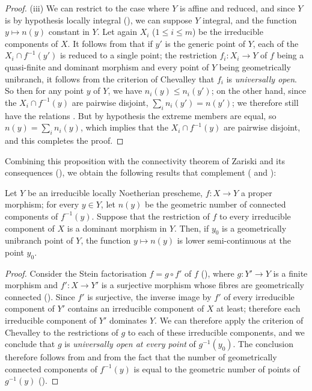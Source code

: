 \begin{proof}
(iii)
We can restrict to the case where $Y$ is affine and reduced, and since $Y$ is by hypothesis locally integral (), we can suppose $Y$ integral, and the function $y\mapsto n(y)$ constant in $Y$.
Let again $X_i$ ($1\leq i\leq m$) be the irreducible components of $X$.
It follows from  that if $y'$ is the generic point of $Y$, each of the $X_i\cap f^{-1}(y')$ is reduced to a single point; the restriction $f_i:X_i\to Y$ of $f$ being a quasi-finite and dominant morphism and every point of $Y$ being geometrically unibranch, it follows from the criterion of Chevalley  that $f_i$ is \emph{universally open}.
So then for any point $y$ of $Y$, we have $n_i(y)\leq n_i(y')$; on the other hand, since the $X_i\cap f^{-1}(y)$ are pairwise disjoint, $\sum_i n_i(y')=n(y')$; we therefore still have the relations .
But by hypothesis the extreme members are equal, so $n(y)=\sum_i n_i(y)$, which implies that the $X_i\cap f^{-1}(y)$ are pairwise disjoint, and this completes the proof.
\end{proof}

Combining this proposition with the connectivity theorem of Zariski and its consequences (), we obtain the following results that complement ( and ):

\begin{proposition}[15.5.3]
\label{IV.15.5.3}
Let $Y$ be an irreducible locally Noetherian prescheme, $f:X\to Y$ a proper morphism; for every $y\in Y$, let $n(y)$ be the geometric number of connected components  of $f^{-1}(y)$.
Suppose that the restriction of $f$ to every irreducible component of $X$ is a dominant morphism in $Y$.
Then, if $y_0$ is a geometrically unibranch point of $Y$, the function $y\mapsto n(y)$ is lower semi-continuous at the point $y_0$.
\end{proposition}

\begin{proof}
Consider the Stein factorisation $f=g\circ f'$ of $f$ (), where $g:Y'\to Y$ is a finite morphism and $f':X\to Y'$ is a surjective morphism whose fibres are geometrically connected ().
Since $f'$ is surjective, the inverse image by $f'$ of every irreducible component of $Y'$ contains an irreducible component of $X$ at least; therefore each irreducible component of $Y'$ dominates $Y$.
We can therefore apply the criterion of Chevalley  to the restrictions of $g$ to each of these irreducible components, and we conclude that $g$ is \emph{universally open at every point} of $g^{-1}(y_0)$.
The conclusion therefore follows from  and from the fact that the number of geometrically connected components of $f^{-1}(y)$ is equal to the geometric number of points of $g^{-1}(y)$ ().
\end{proof}

